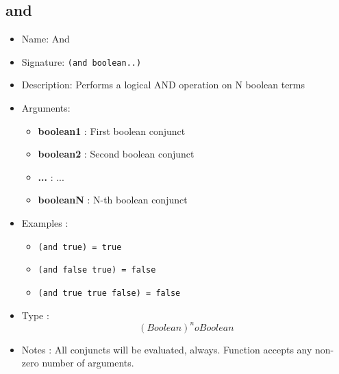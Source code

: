 \subsection{and}
\begin{itemize}
    \item Name: And
    \item Signature: \texttt{(and boolean..)}
    \item Description: Performs a logical AND operation on N boolean terms
    \item Arguments:
        \begin{itemize}
            \item \textbf{boolean1} : First boolean conjunct
            \item \textbf{boolean2} : Second boolean conjunct
            \item \textbf{...} : ...
            \item \textbf{booleanN} : N-th boolean conjunct
        \end{itemize}
    \item Examples :
        \begin{itemize}
            \item \texttt{(and true) = true}
            \item \texttt{(and false true) = false}
            \item \texttt{(and true true false) = false}
        \end{itemize}
    \item Type : \[(Boolean)^n  o Boolean\]
    \item Notes : All conjuncts will be evaluated, always. Function accepts any non-zero number of arguments.
\end{itemize}

